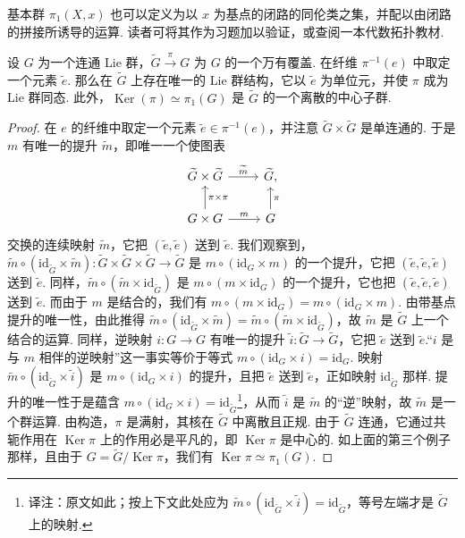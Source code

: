 \begin{remark*}
基本群 $\pi_1(X,x)$ 也可以定义为以 $x$ 为基点的闭路的同伦类之集，并配以由闭路的拼接所诱导的运算. 读者可将其作为习题加以验证，或查阅一本代数拓扑教材.
\end{remark*}
\begin{proposition}\label{prop:lie-1-3-4}
设 $G$ 为一个连通 Lie 群，$\widetilde G\xrightarrow{\ \pi\ }G$ 为 $G$ 的一个万有覆盖. 在纤维 $\pi^{-1}(e)$ 中取定一个元素 $\widetilde e$. 那么在 $\widetilde G$ 上存在唯一的 Lie 群结构，它以 $\widetilde e$ 为单位元，并使 $\pi$ 成为 Lie 群同态. 此外，$\operatorname{Ker}(\pi)\simeq\pi_1(G)$ 是 $\widetilde G$ 的一个离散的中心子群.
\end{proposition}
\begin{proof}
在 $e$ 的纤维中取定一个元素 $\widetilde e\in\pi^{-1}(e)$，并注意 $\widetilde G\times\widetilde G$ 是单连通的. 于是 $m$ 有唯一的提升 $\widetilde m$，即唯一一个使图表
\[
\begin{tikzcd}
\widetilde G\times\widetilde G \ar[r,"{\widetilde m}"] & \widetilde G, \\
G\times G \ar[u,"{\pi\times\pi}"'] \ar[r,"m"] & G \ar[u,"\pi"']
\end{tikzcd}
\]
交换的连续映射 $\widetilde m$，它把 $(\widetilde e,\widetilde e)$ 送到 $\widetilde e$. 我们观察到，$\widetilde m\circ(\mathrm{id}_{\widetilde G}\times\widetilde m):\widetilde G\times\widetilde G\times\widetilde G\longrightarrow\widetilde G$ 是 $m\circ(\mathrm{id}_G\times m)$ 的一个提升，它把 $(\widetilde e,\widetilde e,\widetilde e)$ 送到 $\widetilde e$. 同样，$\widetilde m\circ(\widetilde m\times\mathrm{id}_{\widetilde G})$ 是 $m\circ(m\times\mathrm{id}_G)$ 的一个提升，它也把 $(\widetilde e,\widetilde e,\widetilde e)$ 送到 $\widetilde e$. 而由于 $m$ 是结合的，我们有 $m\circ(m\times\mathrm{id}_G)=m\circ(\mathrm{id}_G\times m)$. 由带基点提升的唯一性，由此推得 $\widetilde m\circ(\mathrm{id}_{\widetilde G}\times\widetilde m)=\widetilde m\circ(\widetilde m\times\mathrm{id}_{\widetilde G})$，故 $\widetilde m$ 是 $\widetilde G$ 上一个结合的运算.
同样，逆映射 $i:G\longrightarrow G$ 有唯一的提升 $\widetilde i:\widetilde G\longrightarrow\widetilde G$，它把 $\widetilde e$ 送到 $\widetilde e$.``$i$ 是与 $m$ 相伴的逆映射''这一事实等价于等式 $m\circ(\mathrm{id}_G\times i)=\mathrm{id}_G$. 映射 $\widetilde m\circ(\mathrm{id}_{\widetilde G}\times\widetilde i)$ 是 $m\circ(\mathrm{id}_G\times i)$ 的提升，且把 $\widetilde e$ 送到 $\widetilde e$，正如映射 $\mathrm{id}_{\widetilde G}$ 那样. 提升的唯一性于是蕴含 $m\circ(\mathrm{id}_G\times i)=\mathrm{id}_{\widetilde G}$\footnote{译注：原文如此；按上下文此处应为 $\widetilde m\circ(\mathrm{id}_{\widetilde G}\times\widetilde i)=\mathrm{id}_{\widetilde G}$，等号左端才是 $\widetilde G$ 上的映射.}，从而 $\widetilde i$ 是 $\widetilde m$ 的``逆''映射，故 $\widetilde m$ 是一个群运算.
由构造，$\pi$ 是满射，其核在 $\widetilde G$ 中离散且正规. 由于 $\widetilde G$ 连通，它通过共轭作用在 $\operatorname{Ker}\pi$ 上的作用必是平凡的，即 $\operatorname{Ker}\pi$ 是中心的. 如上面的第三个例子那样，且由于 $G=\widetilde G/\operatorname{Ker}\pi$，我们有 $\operatorname{Ker}\pi\simeq\pi_1(G)$.
\end{proof}
